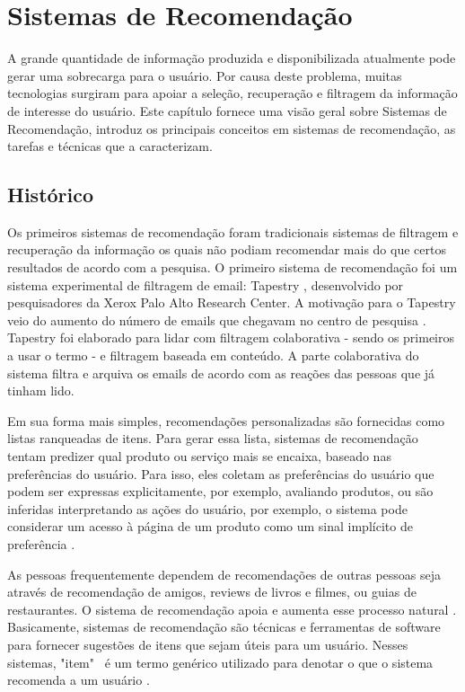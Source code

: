 \chapter{Sistemas de Recomendação}
\label{cap:sistemasRecomendacao}

A grande quantidade de informação produzida e disponibilizada atualmente pode gerar uma sobrecarga para o usuário. Por causa deste problema, muitas tecnologias surgiram para apoiar a seleção, recuperação e filtragem da informação de interesse do usuário. Este capítulo fornece uma visão geral sobre Sistemas de Recomendação, introduz os principais conceitos em sistemas de recomendação, as tarefas e técnicas que a caracterizam.

\section{Histórico}

Os primeiros sistemas de recomendação foram tradicionais sistemas de filtragem e recuperação da informação os quais não podiam recomendar mais do que certos resultados de acordo com a pesquisa. O primeiro sistema de recomendação foi um sistema experimental de filtragem de email: Tapestry \citep{goldberg1992tapestry}, desenvolvido por pesquisadores da Xerox Palo Alto Research Center. A motivação para o Tapestry veio do aumento do número de emails que chegavam no centro de pesquisa \citep{Resnick:1997:RS:245108.245121}. Tapestry foi elaborado para lidar com filtragem colaborativa - sendo os primeiros a usar o termo - e filtragem baseada em conteúdo. A parte colaborativa do sistema filtra e arquiva os emails de acordo com as reações das pessoas que já tinham lido.

Em sua forma mais simples, recomendações personalizadas são fornecidas como listas ranqueadas de itens. Para gerar essa lista, sistemas de recomendação tentam predizer qual produto ou serviço mais se encaixa, baseado nas preferências do usuário. Para isso, eles coletam as preferências do usuário que podem ser expressas explicitamente, por exemplo, avaliando produtos, ou são inferidas interpretando as ações do usuário, por exemplo, o sistema pode considerar um acesso à página de um produto como um sinal implícito de preferência \citep{ricci2011recommender}.

As pessoas frequentemente dependem de recomendações de outras pessoas seja através de recomendação de amigos, reviews de livros e filmes, ou guias de restaurantes. O sistema de recomendação apoia e aumenta esse processo natural \citep{Resnick:1997:RS:245108.245121}. Basicamente, sistemas de recomendação são técnicas e ferramentas de software para fornecer sugestões de itens que sejam úteis para um usuário. Nesses sistemas, "item"~ é um termo genérico utilizado para denotar o que o sistema recomenda a um usuário \citep{ricci2011recommender}.

